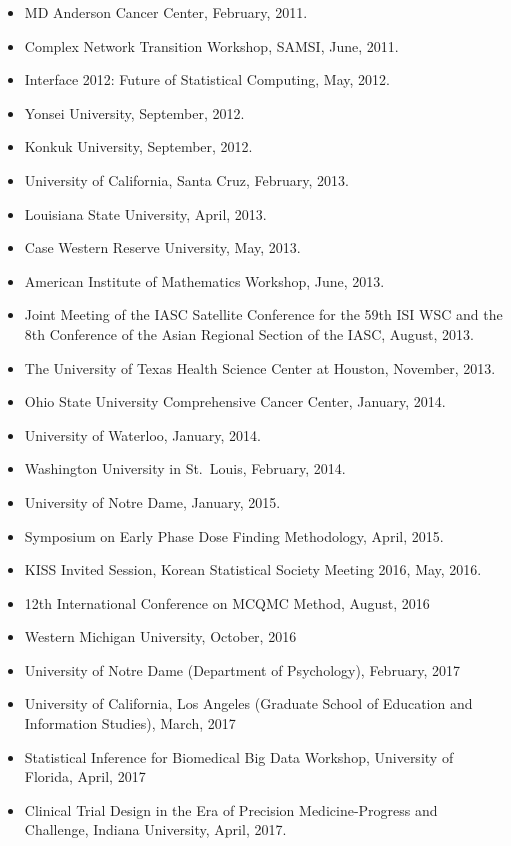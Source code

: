 \documentclass[]{book}
\providecommand{\tightlist}{%
  \setlength{\itemsep}{0pt}\setlength{\parskip}{0pt}}
\begin{document}
\begin{itemize}
\tightlist
\item
  MD Anderson Cancer Center, February, 2011.
\item
  Complex Network Transition Workshop, SAMSI, June, 2011.
\item
  Interface 2012: Future of Statistical Computing, May, 2012.
\item
  Yonsei University, September, 2012.
\item
  Konkuk University, September, 2012.
\item
  University of California, Santa Cruz, February, 2013.
\item
  Louisiana State University, April, 2013.
\item
  Case Western Reserve University, May, 2013.
\item
  American Institute of Mathematics Workshop, June, 2013.
\item
  Joint Meeting of the IASC Satellite Conference for the 59th ISI WSC and the 8th Conference of the Asian Regional Section of the IASC, August, 2013.
\item
  The University of Texas Health Science Center at Houston, November, 2013.
\item
  Ohio State University Comprehensive Cancer Center, January, 2014.
\item
  University of Waterloo, January, 2014.
\item
  Washington University in St.~Louis, February, 2014.
\item
  University of Notre Dame, January, 2015.
\item
  Symposium on Early Phase Dose Finding Methodology, April, 2015.
\item
  KISS Invited Session, Korean Statistical Society Meeting 2016, May, 2016.
\item
  12th International Conference on MCQMC Method, August, 2016
\item
  Western Michigan University, October, 2016
\item
  University of Notre Dame (Department of Psychology), February, 2017
\item
  University of California, Los Angeles (Graduate School of Education and Information Studies), March, 2017
\item
  Statistical Inference for Biomedical Big Data Workshop, University of Florida, April, 2017
\item
  Clinical Trial Design in the Era of Precision Medicine-Progress and Challenge, Indiana University, April, 2017.

\end{itemize}
\end{document}
